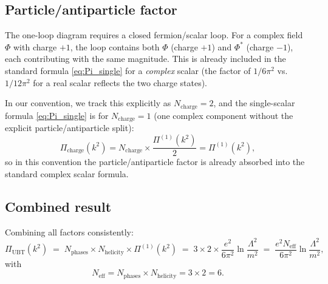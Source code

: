 \documentclass[12pt,a4paper]{article}
\theoremstyle{definition}
\theoremstyle{remark}
\newcommand{\Neff}{N_{\mathrm{eff}}}
\begin{document}
\subsection{Particle/antiparticle factor}

The one-loop diagram requires a closed fermion/scalar loop.  For a complex
field $\Phi$ with charge $+1$, the loop contains both $\Phi$ (charge $+1$)
and $\Phi^*$ (charge $-1$), each contributing with the same magnitude.
This is already included in the standard formula \eqref{eq:Pi_single} for
a \emph{complex} scalar (the factor of $1/6\pi^2$ vs. $1/12\pi^2$ for a real
scalar reflects the two charge states).

In our convention, we track this explicitly as $N_\mathrm{charge} = 2$,
and the single-scalar formula \eqref{eq:Pi_single} is for $N_\mathrm{charge} = 1$
(one complex component without the explicit particle/antiparticle split):
\begin{equation}
  \Pi_\mathrm{charge}(k^2)
  = N_\mathrm{charge} \times \frac{\Pi^{(1)}(k^2)}{2}
  = \Pi^{(1)}(k^2),
  \label{eq:Pi_charge}
\end{equation}
so in this convention the particle/antiparticle factor is already absorbed
into the standard complex scalar formula.

\subsection{Combined result}

Combining all factors consistently:
\begin{equation}
  \Pi_\mathrm{UBT}(k^2)
  \;=\; N_\mathrm{phases} \times N_\mathrm{helicity}
  \times \Pi^{(1)}(k^2)
  \;=\; 3 \times 2 \times \frac{e^2}{6\pi^2}\ln\frac{\Lambda^2}{m^2}
  \;=\; \frac{e^2 \Neff}{6\pi^2}\ln\frac{\Lambda^2}{m^2},
  \label{eq:Pi_UBT}
\end{equation}
with
\begin{equation}
  \Neff = N_\mathrm{phases} \times N_\mathrm{helicity} = 3 \times 2 = 6.
  \label{eq:Neff_intermediate}
\end{equation}
\end{document}
